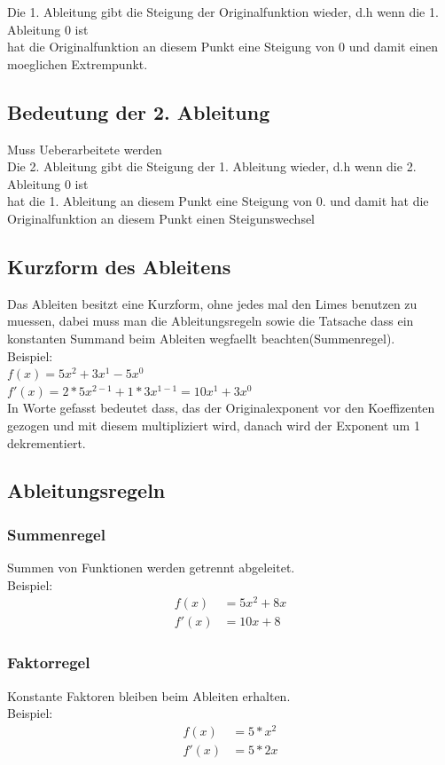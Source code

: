 \documentclass[a4paper]{article} %
\begin{document}
	Die 1. Ableitung gibt die Steigung der Originalfunktion wieder, d.h wenn die 1. Ableitung 0 ist \\hat die Originalfunktion an diesem Punkt eine 
	Steigung von 0 und damit einen moeglichen Extrempunkt.
	
	\subsection{Bedeutung der 2. Ableitung}
	Muss Ueberarbeitete werden\\
	Die 2. Ableitung gibt die Steigung der 1. Ableitung wieder, d.h wenn die 2. Ableitung 0 ist \\hat die 1. Ableitung an diesem Punkt eine 
	Steigung von 0. und damit hat die Originalfunktion an diesem Punkt einen Steigunswechsel
	\subsection{Kurzform des Ableitens}
	
	Das Ableiten besitzt eine Kurzform, ohne jedes mal den Limes benutzen zu muessen, dabei muss man die Ableitungsregeln sowie die Tatsache dass ein konstanten Summand beim Ableiten wegfaellt beachten(Summenregel).
\\	Beispiel:\\
	$f(x)  =5x^2+3x^1-5x^0$\\
	$f'(x)  =2*5x^{2-1}+1*3x^{1-1} = 10x^1+3x^0$\\
	In Worte gefasst bedeutet dass, das der Originalexponent vor den Koeffizenten gezogen und mit diesem multipliziert wird, danach wird der Exponent um 1 dekrementiert.
	\subsection{Ableitungsregeln}
	\subsubsection{Summenregel}
	Summen von Funktionen werden getrennt abgeleitet. \\
	Beispiel: \\ 
		\begin{align*}
			f(x) &= 5x^2+8x  \\
			 f'(x)&= 10x+8
		\end{align*}
	\subsubsection{Faktorregel}
	Konstante Faktoren bleiben beim Ableiten erhalten. \\
	Beispiel: \\ \begin{align*}
					f(x)&= 5*x^2 \\ 
					f'(x) &= 5*2x
				\end{align*}
	
\end{document}
